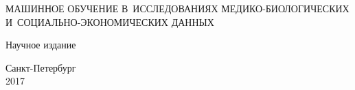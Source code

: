 \begin{center}%
	
	\LARGE \MakeUppercase{Машинное обучение в~исследованиях медико-биологических и~социально-экономических данных}
\end{center}%


\vspace{0pt plus1fill} %
%	


\begin{center}
	Научное издание
\end{center}

%
\vspace{0pt plus4fill} %
\begin{center}%


Санкт-Петербург\\
2017
\end{center}%
\newpage
